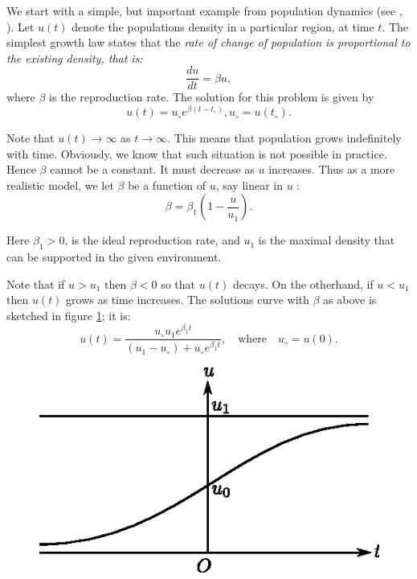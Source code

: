 We start with a simple, but important example from population dynamics
(see \cite{key11}, \cite{key24}). Let $u(t)$ denote the populations
density in a particular region, at time $t$. The simplest growth law
states that the 
\textit{rate of change of population is proportional to the existing
  density, that is:} 
\begin{equation*}
\frac{du}{dt}=\beta u,\tag{1.3}\label{chap1-sec1.2-eq1.3}
\end{equation*}
where $\beta$ is the reproduction rate. The solution for this problem
is given by   
\begin{equation*}
u(t)= u_\circ e^{\beta (t-t_\circ)}, u_\circ = u(t_\circ).
\tag{1.4}\label{chap1-sec1.2-eq1.4} 
\end{equation*}

Note that $u(t)\to \infty$ as $t\to \infty$. This means that
population grows indefinitely with time. Obviously, we know that such
situation is not possible in practice. Hence $\beta$ cannot be a
constant. It must decrease as $u$ increases. Thus as a more realistic
model, we let $\beta$ be a function of $u$, say linear in $u$ : 
\begin{equation*} 
\beta = \beta_1(1-\frac{u}{u_1}). \tag{1.5}\label{chap1-sec1.2-eq1.5}
\end{equation*}

Here $\beta_1 > 0$,  is the ideal reproduction rate, and $u_1$ is the
maximal density that can be supported in the given environment.  
 
Note that if $u > u_1$ then $\beta < 0$ so that $u(t)$ decays. On the
other\pageoriginale hand, if $u < u_1$ then $u(t)$ grows as time increases. The
solutions curve with $\beta$ as above is sketched in
figure \ref{chap1-sec1.2-fig1.1}; it 
is: 
\begin{equation*}
u(t)= \frac{u_\circ u_1e^{\beta_1t}}{(u_1-u_\circ) + u_\circ
  e^{\beta_1 t}},\quad \text{where}\quad u_\circ =
u(0). \tag{1.6}\label{chap1-sec1.2-eq1.6}  
\end{equation*}

\begin{figure}[H]
\centering
\includegraphics{vol79-fig/fig79-1.eps}
\caption{}
\label{chap1-sec1.2-fig1.1}
\end{figure}


